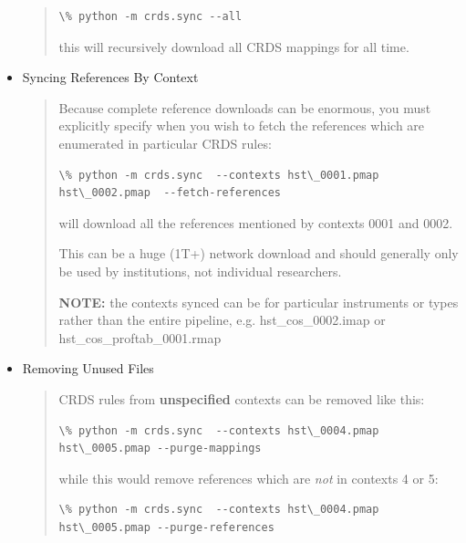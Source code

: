 \documentclass[letterpaper,10pt,english]{sphinxmanual}
\begin{document}
\begin{itemize}
\begin{quote}
\begin{Verbatim}[commandchars=\\\{\}]
\% python -m crds.sync --all
\end{Verbatim}

this will recursively download all CRDS mappings for all time.
\end{quote}

\item {} 
Syncing References By Context
\begin{quote}

Because complete reference downloads can be enormous,  you must explicitly specify when
you wish to fetch the references which are enumerated in particular CRDS rules:

\begin{Verbatim}[commandchars=\\\{\}]
\% python -m crds.sync  --contexts hst\_0001.pmap hst\_0002.pmap  --fetch-references
\end{Verbatim}

will download all the references mentioned by contexts 0001 and 0002.

This can be a huge (1T+) network download and should generally only be
used by institutions,  not individual researchers.

\textbf{NOTE:} the contexts synced can be for particular instruments or types rather than
the entire pipeline,  e.g. hst\_cos\_0002.imap or hst\_cos\_proftab\_0001.rmap
\end{quote}

\item {} 
Removing Unused Files
\begin{quote}

CRDS rules from \textbf{unspecified} contexts can be removed like this:

\begin{Verbatim}[commandchars=\\\{\}]
\% python -m crds.sync  --contexts hst\_0004.pmap hst\_0005.pmap --purge-mappings
\end{Verbatim}

while this would remove references which are \emph{not} in contexts 4 or 5:

\begin{Verbatim}[commandchars=\\\{\}]
\% python -m crds.sync  --contexts hst\_0004.pmap hst\_0005.pmap --purge-references
\end{Verbatim}


\end{quote}
\end{itemize}
\end{document}
